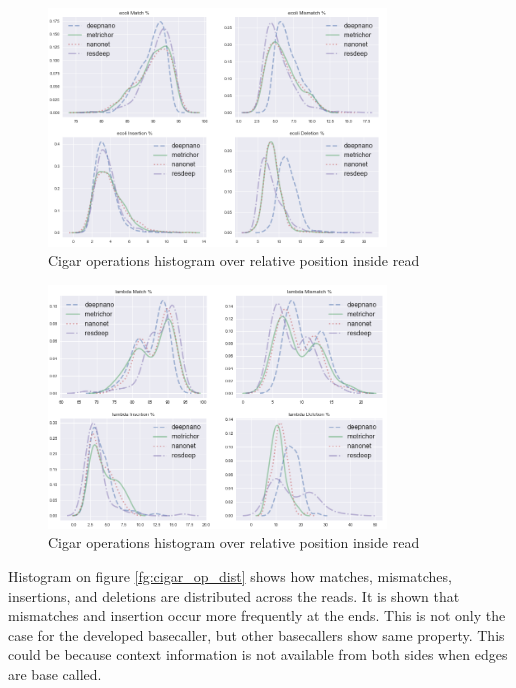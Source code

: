 \documentclass[times, utf8, diplomski, numeric, english]{fer}
\begin{document}
\begin{figure}[!htb]
	\begin{center}
		\includegraphics[width=0.8\textwidth]{./imgs/results/ecoli/kde_cigar_lines.png}
		\caption{Cigar operations histogram over relative position inside read}
		\label{fg:ecoli_kde}
	\end{center}
\end{figure}

\begin{figure}[!htb]
	\begin{center}
		\includegraphics[width=0.8\textwidth]{./imgs/results/lambda/kde_cigar_lines.png}
		\caption{Cigar operations histogram over relative position inside read}
		\label{fg:lambda_kde}
	\end{center}
\end{figure}


Histogram on figure \ref{fg:cigar_op_dist} shows how matches, mismatches, insertions, and deletions are distributed across the reads. It is shown that mismatches and insertion occur more frequently at the ends. This is not only the case for the developed basecaller, but other basecallers show same property. This could be because context information is not available from both sides when edges are base called.
\end{document}
